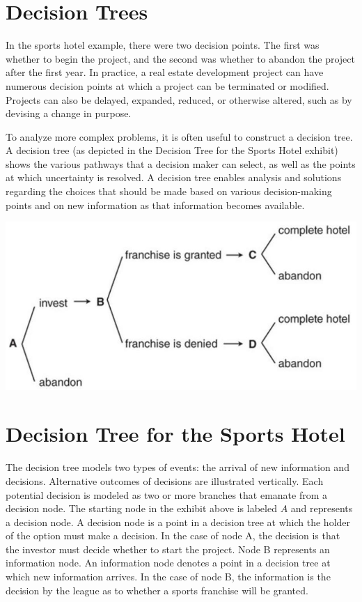 \documentclass[11pt]{article}
\begin{document}
\section*{Decision Trees}
In the sports hotel example, there were two decision points. The first was whether to begin the project, and the second was whether to abandon the project after the first year. In practice, a real estate development project can have numerous decision points at which a project can be terminated or modified. Projects can also be delayed, expanded, reduced, or otherwise altered, such as by devising a change in purpose.

To analyze more complex problems, it is often useful to construct a decision tree. A decision tree (as depicted in the Decision Tree for the Sports Hotel exhibit) shows the various pathways that a decision maker can select, as well as the points at which uncertainty is resolved. A decision tree enables analysis and solutions regarding the choices that should be made based on various decision-making points and on new information as that information becomes available.

\begin{center}
\includegraphics[max width=\textwidth]{2024_04_11_73a6b5609218251c8b58g-3(1)}
\end{center}

\section*{Decision Tree for the Sports Hotel}
The decision tree models two types of events: the arrival of new information and decisions. Alternative outcomes of decisions are illustrated vertically. Each potential decision is modeled as two or more branches that emanate from a decision node. The starting node in the exhibit above is labeled $A$ and represents a decision node. A decision node is a point in a decision tree at which the holder of the option must make a decision. In the case of node A, the decision is that the investor must decide whether to start the project. Node B represents an information node. An information node denotes a point in a decision tree at which new information arrives. In the case of node B, the information is the decision by the league as to whether a sports franchise will be granted.
\end{document}
